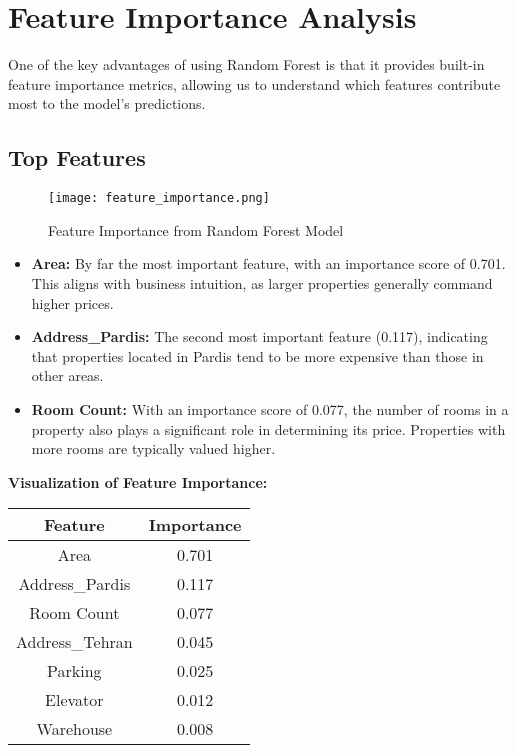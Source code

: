 \documentclass{article}
\begin{document}
\section{Feature Importance Analysis}
One of the key advantages of using Random Forest is that it provides built-in feature importance metrics, allowing us to understand which features contribute most to the model’s predictions.

\subsection{Top Features}

\begin{figure}[h]
    \centering
    \texttt{[image: feature\_importance.png]}
    \caption{Feature Importance from Random Forest Model}
    \label{fig:feature_importance}
\end{figure}

\begin{itemize}
    \item \textbf{Area:} By far the most important feature, with an importance score of 0.701. This aligns with business intuition, as larger properties generally command higher prices.
    \item \textbf{Address\_Pardis:} The second most important feature (0.117), indicating that properties located in Pardis tend to be more expensive than those in other areas.
    \item \textbf{Room Count:} With an importance score of 0.077, the number of rooms in a property also plays a significant role in determining its price. Properties with more rooms are typically valued higher.
\end{itemize}

\textbf{Visualization of Feature Importance:}
\begin{center}
\begin{tabular}{cc}
\toprule
Feature            & Importance \\
\midrule
Area               & 0.701      \\
Address\_Pardis    & 0.117      \\
Room Count         & 0.077      \\
Address\_Tehran     & 0.045      \\
Parking            & 0.025      \\
Elevator           & 0.012      \\
Warehouse          & 0.008      \\
\bottomrule
\end{tabular}
\end{center}
\end{document}
